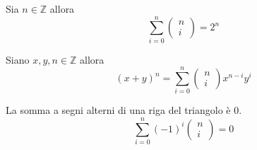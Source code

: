 \begin{observation}
	Sia $n \in \mathbb{Z}$ allora
	\begin{equation*}
		\sum_{i = 0}^n \begin{pmatrix}
			n \\ i
		\end{pmatrix} = 2^n
	\end{equation*}
\end{observation}

\begin{theorem}
	Siano $x, y, n \in \mathbb{Z}$ allora
	\begin{equation*}
		(x + y)^n = \sum_{i = 0}^n \begin{pmatrix}
			n \\ i
		\end{pmatrix}
		x^{n - i} y^i
	\end{equation*}
\end{theorem}

\begin{observation}
	La somma a segni alterni di una riga del triangolo \`e 0.
	\begin{equation*}
		\sum_{i = 0}^n
		(-1)^i
		\begin{pmatrix}
			n \\ i
		\end{pmatrix} = 0
	\end{equation*}
\end{observation}

